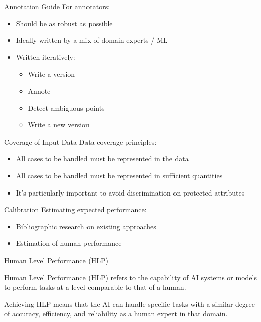 \begin{frame}{Annotation Guide}
  For annotators:
  \begin{itemize}
    \item Should be as robust as possible
    \item Ideally written by a mix of domain experts / ML
    \item Written iteratively:
      \begin{itemize}
        \item Write a version
        \item Annote
        \item Detect ambiguous points
        \item Write a new version
      \end{itemize}
  \end{itemize}

  \hugo
\end{frame}


\begin{frame}{Coverage of Input Data}
  Data coverage principles:
  \begin{itemize}
    \item All cases to be handled must be represented in the data
    \item All cases to be handled must be represented in sufficient quantities
    \item It's particularly important to avoid discrimination on protected attributes
  \end{itemize}

  \hugo
\end{frame}


\begin{frame}{Calibration}
  Estimating expected performance:
  \begin{itemize}
    \item Bibliographic research on existing approaches
    \item Estimation of human performance
  \end{itemize}

  \hugo
\end{frame}



\begin{frame}{Human Level Performance (HLP)}

  Human Level Performance (HLP) refers to the capability of AI systems
  or models to perform tasks at a level comparable to that of a
  human.

  Achieving HLP means that the AI can handle specific tasks with a
  similar degree of accuracy, efficiency, and reliability as a human
  expert in that domain.

\end{frame}

